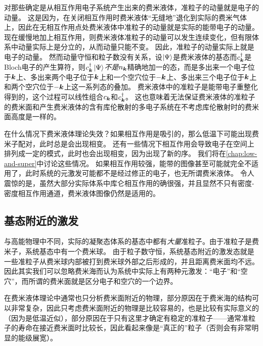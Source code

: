 对那些确定是从相互作用电子系统产生出来的费米液体，准粒子的动量就是电子的动量。
这是因为，在关闭相互作用时费米液体“无缝地”退化到实际的费米气体上，因此在无相互作用点处费米液体中准粒子的动量就是实际的能带电子的动量。
现在缓慢地加上相互作用，则费米液体准粒子的动量可以发生连续变化，但有限体系中动量实际上是分立的，从而动量只能不变。
因此，准粒子的动量实际上就是电子的动量。
然而动量守恒和粒子数没有关系，设$\ket{\Psi}$是费米液体的基态而$c^\dagger_{\vb*{k}}$是Bloch电子的产生算符，则$c^\dagger_{\vb*{k}} \ket{\Psi}$\emph{不是}$n_{\vb*{k}}$精确地加一的态，而是多出来一个电子位于$\vb*{k}$上、多出来两个电子位于$\vb*{k}$上和一个空穴位于$-\vb*{k}$上、多出来三个电子位于$\vb*{k}$上和两个空穴位于$-\vb*{k}$上这一系列态的叠加。
费米液体中的准粒子是能带电子重整化得到的，这个过程可以线性组合$c_{\vb*{k}}$和$c^\dagger_{\vb*{k}}$。
这也意味着无法保证费米液体的准粒子的费米面和产生费米液体的含有库伦散射的多电子系统在不考虑库伦散射时的费米面高度是一样的。

在什么情况下费米液体理论失效？如果相互作用是吸引的，那么低温下可能出现费米子配对，此时总是会出现相变。
还有一些情况下相互作用会导致电子在空间上排列成一定的模式，此时也会出现相变，因为出现了新的序。
我们将在\autoref{chap:low-and-super}中讨论这些情况。
如果相互作用较强，能带的图像甚至可能就完全不适用了，此时系统的元激发可能都不是经过修正的电子，也无所谓费米液体。
令人震惊的是，虽然大部分实际体系中库仑相互作用的确很强，并且显然不只有密度-密度相互作用通道，费米液体图像仍然是适用的。

\subsection{基态附近的激发}\label{sec:fermi-liquid-ground}

与高能物理中不同，实际的凝聚态体系的基态中都有\emph{大量}准粒子。由于准粒子是费米子，系统基态中有一个费米球。
由于粒子数守恒，系统基态附近的激发态就是一些准粒子从费米球内部被打到费米球外部之后形成的，并且距离费米面均不远。
因此其实我们可以忽略费米海而认为系统中实际上有两种元激发：“电子”和“空穴”，而所谓的费米面就是区分电子和空穴的一个边界。

在费米液体理论中通常也只分析费米面附近的物理，部分原因在于费米海的结构可以非常复杂，因此只考虑费米面附近的物理是比较容易的，也是比较有实际意义的（因为是低温近似），部分原因在于只有这里才确定有稳定的准粒子——通常准粒子的寿命在接近费米面时比较长，因此看起来像是“真正的”粒子（否则会有非常明显的能级展宽）。

